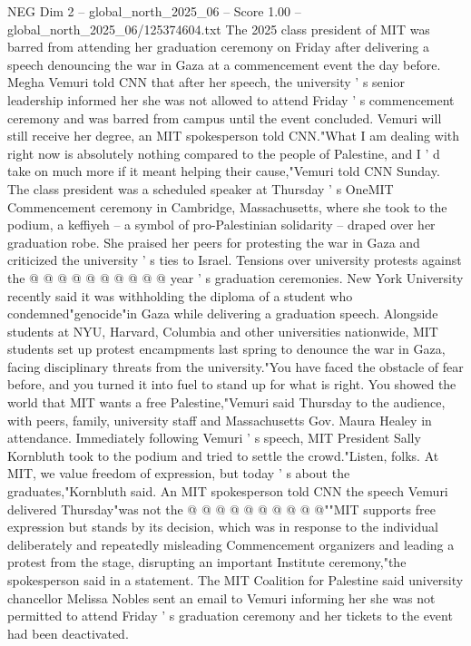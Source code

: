 \begin{textsample}{NEG Dim 2 – global\_north\_2025\_06 – Score 1.00 – global\_north\_2025\_06/125374604.txt}  \label{ex:f2_neg_220}
The 2025 class president of MIT was barred from attending her graduation ceremony on Friday after delivering a speech denouncing the war in Gaza at a commencement event the day before.
Megha Vemuri told CNN that after her speech, the university ' s senior leadership informed her she was not allowed to attend Friday ' s commencement ceremony and was barred from campus until the event concluded.
Vemuri will still receive her degree, an MIT spokesperson told CNN."What I am dealing with right now is absolutely nothing compared to the people of Palestine, and I ' d take on much more if it meant helping their cause,"Vemuri told CNN Sunday.
The class president was a scheduled speaker at Thursday ' s OneMIT Commencement ceremony in Cambridge, Massachusetts, where she took to the podium, a keffiyeh -- a symbol of pro-Palestinian solidarity -- draped over her graduation robe.
She praised her peers for protesting the war in Gaza and criticized the university ' s ties to Israel.
Tensions over university protests against the @ @ @ @ @ @ @ @ @ @ year ' s graduation ceremonies.
New York University recently said it was withholding the diploma of a student who condemned"genocide"in Gaza while delivering a graduation speech.
Alongside students at NYU, Harvard, Columbia and other universities nationwide, MIT students set up protest encampments last spring to denounce the war in Gaza, facing disciplinary threats from the university."You have faced the obstacle of fear before, and you turned it into fuel to stand up for what is right.
You showed the world that MIT wants a free Palestine,"Vemuri said Thursday to the audience, with peers, family, university staff and Massachusetts Gov.
Maura Healey in attendance.
Immediately following Vemuri ' s speech, MIT President Sally Kornbluth took to the podium and tried to settle the crowd."Listen, folks.
At MIT, we value freedom of expression, but today ' s about the graduates,"Kornbluth said.
An MIT spokesperson told CNN the speech Vemuri delivered Thursday"was not the @ @ @ @ @ @ @ @ @ @""MIT supports free expression but stands by its decision, which was in response to the individual deliberately and repeatedly misleading Commencement organizers and leading a protest from the stage, disrupting an important Institute ceremony,"the spokesperson said in a statement.
The MIT Coalition for Palestine said university chancellor Melissa Nobles sent an email to Vemuri informing her she was not permitted to attend Friday ' s graduation ceremony and her tickets to the event had been deactivated.

\end{textsample}
